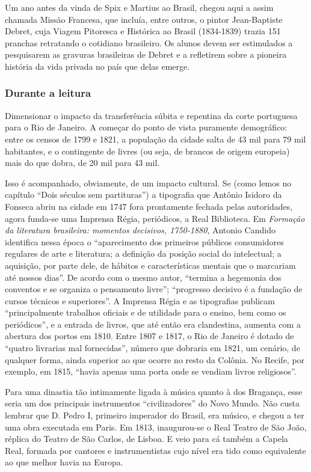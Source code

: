 \documentclass[11pt]{extarticle}
\begin{document}
Um ano antes da vinda de Spix e Martius ao Brasil, chegou aqui a assim chamada
Missão Francesa, que incluía, entre outros, o pintor Jean-Baptiste Debret, cuja
Viagem Pitoresca e Histórica ao Brasil (1834-1839) trazia 151 pranchas
retratando o cotidiano brasileiro. Os alunos devem ser estimulados a
pesquisarem as gravuras brasileiras de Debret e a refletirem sobre a pioneira
história da vida privada no país que delas emerge.

\subsubsection{Durante a leitura}

Dimensionar o impacto da transferência súbita e repentina da corte portuguesa
para o Rio de Janeiro. A começar do ponto de vista puramente demográfico: entre
os censos de 1799 e 1821, a população da cidade salta de 43 mil para 79 mil
habitantes, e o contingente de livres (ou seja, de brancos de origem europeia)
mais do que dobra, de 20 mil para 43 mil. 

Isso é acompanhado, obviamente, de um impacto cultural. Se (como lemos no
capítulo ``Dois séculos sem partituras'') a tipografia que Antônio Isidoro da
Fonseca abriu na cidade em 1747 fora prontamente fechada pelas autoridades,
agora funda-se uma Imprensa Régia, periódicos, a Real Biblioteca. Em \emph{Formação
da literatura brasileira: momentos decisivos, 1750-1880}, Antonio Candido
identifica nessa época o “aparecimento dos primeiros públicos consumidores
regulares de arte e literatura; a definição da posição social do intelectual; a
aquisição, por parte dele, de hábitos e características mentais que o marcariam
até nossos dias”. De acordo com o mesmo autor, “termina a hegemonia dos
conventos e se organiza o pensamento livre”; “progresso decisivo é a fundação
de cursos técnicos e superiores”. A Imprensa Régia e as tipografias publicam
“principalmente trabalhos oficiais e de utilidade para o ensino, bem como os
periódicos”, e a entrada de livros, que até então era clandestina, aumenta com
a abertura dos portos em 1810. Entre 1807 e 1817, o Rio de Janeiro é dotado de
“quatro livrarias mal fornecidas”, número que dobraria em 1821, um cenário, de
qualquer forma, ainda superior ao que ocorre no resto da Colônia. No Recife,
por exemplo, em 1815, “havia apenas uma porta onde se vendiam livros
religiosos”.

Para uma dinastia tão intimamente ligada à música quanto à dos Bragança, esse
seria um dos principais instrumentos “civilizadores” do Novo Mundo. Não custa
lembrar que D. Pedro I, primeiro imperador do Brasil, era músico, e chegou a
ter uma obra executada em Paris. Em 1813, inaugurou-se o Real Teatro de São
João, réplica do Teatro de São Carlos, de Lisboa. E veio para cá também a
Capela Real, formada por cantores e instrumentistas cujo nível era tido como
equivalente ao que melhor havia na Europa.
\end{document}
